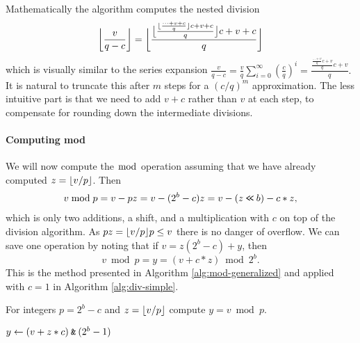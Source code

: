 Mathematically the algorithm computes the nested division
$$
	\bbfloor{\frac{v}{q-c}}
	=
	\bbfloor{\frac{
			\bfloor{\frac{
					\floor{\frac{
							\dots+v+c
						}{q}}c +v+c
				}{q}}c +v+c
		}{q}}
	\vspace{-1em} %
$$
which is visually similar to the series expansion
$
	\frac{v}{q-c}
	= \frac{v}{q}\sum_{i=0}^\infty (\frac{c}{q})^i
	= \frac{\frac{\frac{\dots+v}{q}c+v}{q}c+v}{q}.
$
It is natural to truncate this after $m$ steps for a $(c/q)^m$ approximation.
The less intuitive part is that we need to add $v+c$ rather than $v$ at each step, to compensate for rounding down the intermediate divisions.

\paragraph{Computing mod}
We will now compute the $\bmod$ operation assuming that
we have already computed $z=\lfloor {v/p} \rfloor$. Then
\begin{align}
	v \bmod p
	= v - pz
	= v - (2^b-c)z
	= v - (z\mathbin{\texttt{<\!<}} b) - c*z,
\end{align}
which is only two additions, a shift, and a multiplication with $c$ on top of the division algorithm.
As $pz = \lfloor {v/p} \rfloor p \le v$ there is no danger of overflow.
We can save one operation by noting
that if $v = z (2^b-c) + y$, then
$$v\bmod p = y=\left(v+c*z \right) \bmod 2^b.$$
This is the method presented in Algorithm \ref{alg:mod-generalized} and applied with $c=1$ in Algorithm \ref{alg:div-simple}.
\begin{algorithm}[H]
	\caption{For integers $p=2^b-c$ and $z=\lfloor {v/p} \rfloor$ compute
		$y=v \bmod p$.}
	\label{alg:mod-generalized}
	\begin{algorithmic}
		\State $y \gets (v + z*c) \mathbin{\texttt{\&}} (2^b-1)$
	\end{algorithmic}
\end{algorithm}




